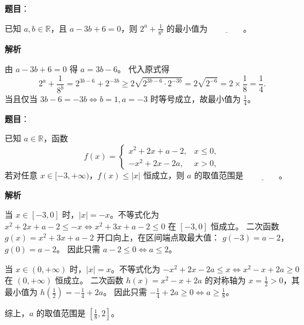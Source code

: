 \begin{answer}

\textbf{题目}：

已知 $a,b\in\mathbb R$，且 $a-3b+6=0$，则 $2^a+\frac1{8^b}$ 的最小值为 $\underline{\qquad\qquad}$。

\textbf{解析}

由 $a-3b+6=0$ 得 $a=3b-6$。
代入原式得
\nopagebreak[4]
\[2^a+\frac1{8^b}=2^{3b-6}+2^{-3b}\geqslant 2\sqrt{2^{3b-6}\cdot 2^{-3b}}=2\sqrt{2^{-6}}=2\times\frac18=\frac14.\]
当且仅当 $3b-6=-3b\iff b=1,a=-3$ 时等号成立，故最小值为 $\frac14$。


\end{answer}
\begin{answer}

\textbf{题目}：

已知 $a\in\mathbb R$，函数
\nopagebreak[4]
\[
f(x)=\begin{cases}
x^2+2x+a-2,&x\leqslant0,\\
-x^2+2x-2a,&x>0,
\end{cases}
\]
若对任意 $x\in[-3,+\infty)$，$f(x)\leqslant|x|$ 恒成立，则 $a$ 的取值范围是 $\underline{\qquad\qquad}$。

\textbf{解析}

当 $x\in[-3,0]$ 时，$|x|=-x$。不等式化为 $x^2+2x+a-2\leqslant -x\iff x^2+3x+a-2\leqslant 0$ 在 $[-3,0]$ 恒成立。
二次函数 $g(x)=x^2+3x+a-2$ 开口向上，在区间端点取最大值：
$g(-3)=a-2$，$g(0)=a-2$。
因此只需 $a-2\leqslant 0\iff a\leqslant 2$。

当 $x\in(0,+\infty)$ 时，$|x|=x$。不等式化为 $-x^2+2x-2a\leqslant x\iff x^2-x+2a\geqslant 0$ 在 $(0,+\infty)$ 恒成立。
二次函数 $h(x)=x^2-x+2a$ 的对称轴为 $x=\frac12>0$，其最小值为 $h\left(\frac12\right)=-\frac14+2a$。
因此只需 $-\frac14+2a\geqslant 0\iff a\geqslant \frac18$。

综上，$a$ 的取值范围是 $\left[\frac18,2\right]$。


\end{answer}

